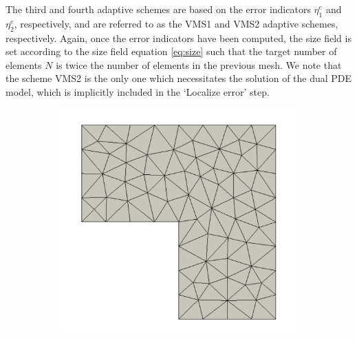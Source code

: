The third and fourth adaptive schemes are based on the
error indicators $\eta^e_1$ and $\eta^e_2$, respectively,
and are referred to as the \textsc{VMS1} and \textsc{VMS2}
adaptive schemes, respectively. Again, once the error
indicators have been computed, the size field is set
according to the size field equation \eqref{eq:size}
such that the target number of elements $N$ is twice
the number of elements in the previous mesh.
We note that the scheme \textsc{VMS2} is the only one
which necessitates the solution of the dual PDE model,
which is implicitly included in the `Localize error'
step.

\begin{figure}[hbt!]
\centering
\begin{subfigure}{.3\textwidth}
\centering
\includegraphics[width=.99\linewidth]{img/vms_lshape_global_initial}
\end{subfigure}%
\begin{subfigure}{.3\textwidth}
\centering

\end{subfigure}
\end{figure}
